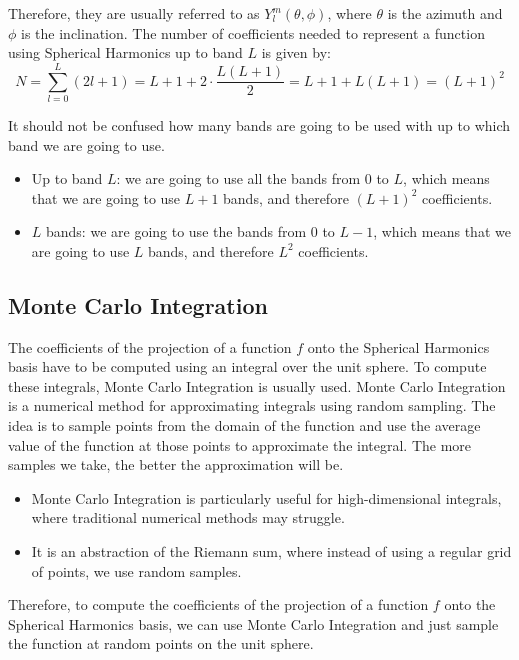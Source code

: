 Therefore, they are usually referred to as $Y_l^m(\theta, \phi)$, where $\theta$ is the azimuth and $\phi$ is the inclination. The number of coefficients needed to represent a function using Spherical Harmonics up to band $L$ is given by:
\begin{equation*}
    N = \sum_{l=0}^{L} (2l + 1) = L+1 + 2\cdot \frac{L(L+1)}{2} = L+1 + L(L+1) = (L+1)^2
\end{equation*}
\begin{observacion}
    It should not be confused how many bands are going to be used with up to which band we are going to use.
    \begin{itemize}
        \item Up to band $L$: we are going to use all the bands from $0$ to $L$, which means that we are going to use $L+1$ bands, and therefore $(L+1)^2$ coefficients.
        \item $L$ bands: we are going to use the bands from $0$ to $L-1$, which means that we are going to use $L$ bands, and therefore $L^2$ coefficients.
    \end{itemize}
\end{observacion}

\subsection{Monte Carlo Integration}

The coefficients of the projection of a function $f$ onto the Spherical Harmonics basis have to be computed using an integral over the unit sphere. To compute these integrals, Monte Carlo Integration is usually used.
Monte Carlo Integration is a numerical method for approximating integrals using random sampling. The idea is to sample points from the domain of the function and use the average value of the function at those points to approximate the integral. The more samples we take, the better the approximation will be.
\begin{itemize}
    \item Monte Carlo Integration is particularly useful for high-dimensional integrals, where traditional numerical methods may struggle.
    \item It is an abstraction of the Riemann sum, where instead of using a regular grid of points, we use random samples.
\end{itemize}

Therefore, to compute the coefficients of the projection of a function $f$ onto the Spherical Harmonics basis, we can use Monte Carlo Integration and just sample the function at random points on the unit sphere.

